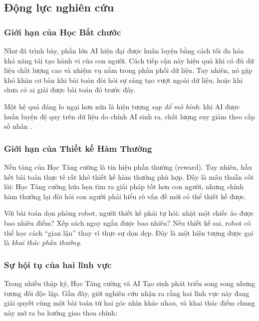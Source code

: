 \subsection{Động lực nghiên cứu}
 
\subsubsection{Giới hạn của Học Bắt chước}
 
Như đã trình bày, phần lớn AI hiện đại được huấn luyện bằng cách tối
đa hóa khả năng tái tạo hành vi của con người. Cách tiếp cận này hiệu
quả khi có đủ dữ liệu chất lượng cao và nhiệm vụ nằm trong phân phối
dữ liệu. Tuy nhiên, nó gặp khó khăn cơ bản khi bài toán đòi hỏi sự
sáng tạo vượt ngoài dữ liệu, hoặc khi chưa có ai giải được bài toán
đó trước đây.
 
Một hệ quả đáng lo ngại hơn nữa là hiện tượng \textit{sụp đổ mô hình}:
khi AI được huấn luyện đệ quy trên dữ liệu do chính AI sinh ra, chất
lượng suy giảm theo cấp số nhân \cite{shumailov2024ai}.
 
\subsubsection{Giới hạn của Thiết kế Hàm Thưởng}
 
Nền tảng của Học Tăng cường là tín hiệu phần thưởng (reward).
Tuy nhiên, hầu hết bài toán thực tế rất khó thiết kế hàm thưởng
phù hợp. Đây là mâu thuẫn cốt lõi: Học Tăng cường hứa hẹn tìm ra giải pháp
tốt hơn con người, nhưng chính hàm thưởng lại đòi hỏi con người
phải hiểu rõ vấn đề mới có thể thiết kế được.
 
Với bài toán dọn phòng robot, người thiết kế phải tự hỏi: nhặt một
chiếc áo được bao nhiêu điểm? Xếp sách ngay ngắn được bao nhiêu? Nếu
thiết kế sai, robot có thể học cách ``gian lận'' thay vì thực sự dọn
dẹp. Đây là một hiện tượng được gọi là \textit{khai thác phần thưởng}.
 
\subsubsection{Sự hội tụ của hai lĩnh vực}
 
Trong nhiều thập kỷ, Học Tăng cường và AI Tạo sinh phát triển song song nhưng
tương đối độc lập. Gần đây, giới nghiên cứu nhận ra rằng hai lĩnh vực
này đang giải quyết cùng một bài toán từ hai góc nhìn khác nhau, và
khai thác điểm chung này mở ra ba hướng giao thoa chính:
 
